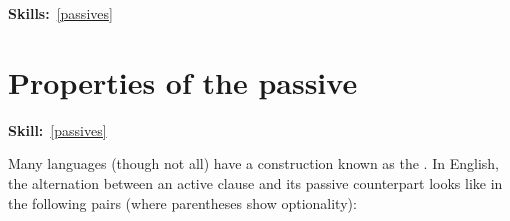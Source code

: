 \documentclass{article}
\begin{document}
\maketitle
\subtitle{Topic 8 Course Notes: Passives}
\hfill{}\textbf{Skills:}~\ref{passives}


\section{Properties of the passive}
\hfill{}\textbf{Skill:}~\ref{passives}

Many languages (though not all) have a construction known as the . In English, the alternation between an active clause and its passive counterpart looks like in the following pairs (where parentheses show optionality):
\begin{exe}
\begin{multicols}{2}
    \label{passive_examples_1}
    \label{passive_examples_2}
\end{multicols}
\end{exe}
\end{document}
